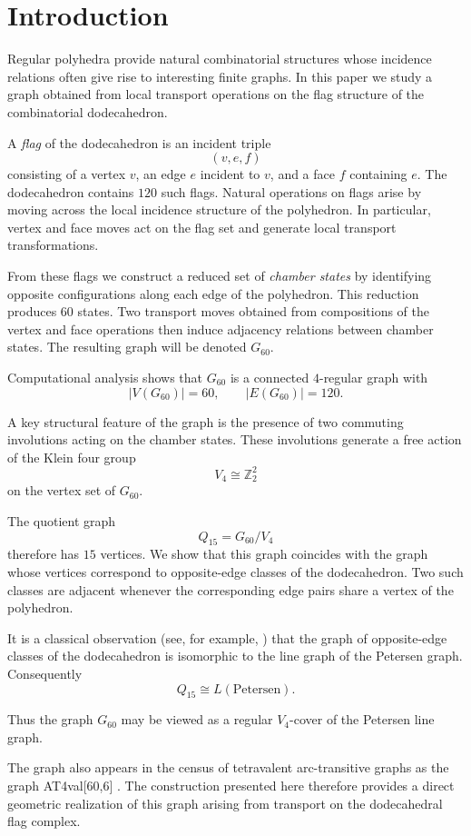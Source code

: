 \section{Introduction}

Regular polyhedra provide natural combinatorial structures whose
incidence relations often give rise to interesting finite graphs.
In this paper we study a graph obtained from local transport operations
on the flag structure of the combinatorial dodecahedron.

A \emph{flag} of the dodecahedron is an incident triple
\[
(v,e,f)
\]
consisting of a vertex $v$, an edge $e$ incident to $v$, and a face
$f$ containing $e$.  The dodecahedron contains $120$ such flags.
Natural operations on flags arise by moving across the local incidence
structure of the polyhedron.  In particular, vertex and face moves
act on the flag set and generate local transport transformations.

From these flags we construct a reduced set of \emph{chamber states}
by identifying opposite configurations along each edge of the
polyhedron.  This reduction produces $60$ states.  Two transport
moves obtained from compositions of the vertex and face operations
then induce adjacency relations between chamber states.  The resulting
graph will be denoted $G_{60}$.

Computational analysis shows that $G_{60}$ is a connected
$4$-regular graph with
\[
|V(G_{60})| = 60, \qquad |E(G_{60})| = 120.
\]

A key structural feature of the graph is the presence of two commuting
involutions acting on the chamber states.  These involutions generate a
free action of the Klein four group
\[
V_4 \cong \mathbb{Z}_2^2
\]
on the vertex set of $G_{60}$.

The quotient graph
\[
Q_{15} = G_{60}/V_4
\]
therefore has $15$ vertices.  We show that this graph coincides with
the graph whose vertices correspond to opposite-edge classes of the
dodecahedron.  Two such classes are adjacent whenever the corresponding
edge pairs share a vertex of the polyhedron.

It is a classical observation (see, for example,
\cite{godsil_royle}) that the graph of opposite-edge classes of the
dodecahedron is isomorphic to the line graph of the Petersen graph.
Consequently
\[
Q_{15} \cong L(\mathrm{Petersen}).
\]

Thus the graph $G_{60}$ may be viewed as a regular $V_4$-cover of the
Petersen line graph.

The graph also appears in the census of tetravalent arc-transitive
graphs as the graph AT4val[60,6] \cite{potocnik_census}.  The
construction presented here therefore provides a direct geometric
realization of this graph arising from transport on the
dodecahedral flag complex.

